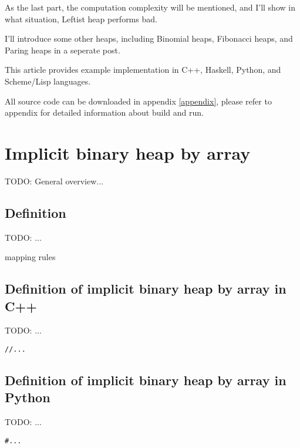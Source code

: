\documentclass{article}
\begin{document}
As the last part, the computation complexity will be mentioned, and
I'll show in what situation, Leftist heap performs bad.

I'll introduce some other heaps, including Binomial heaps, Fibonacci
heaps, and Paring heaps in a seperate post.

This article provides example implementation in C++, Haskell, Python, and 
Scheme/Lisp languages. 

All source code can be downloaded in appendix \ref{appendix}, please 
refer to appendix for detailed information about build and run.


\section{Implicit binary heap by array}
\label{ibheap}

TODO: General overview...

\subsection{Definition}

TODO: ...

mapping rules

\subsection*{Definition of implicit binary heap by array in C++}
TODO: ...

\lstset{language=C++}
\begin{lstlisting}
//...
\end{lstlisting}

\subsection*{Definition of implicit binary heap by array in Python}
TODO: ...

\lstset{language=Python}
\begin{lstlisting}
#...
\end{lstlisting}

\end{document}

